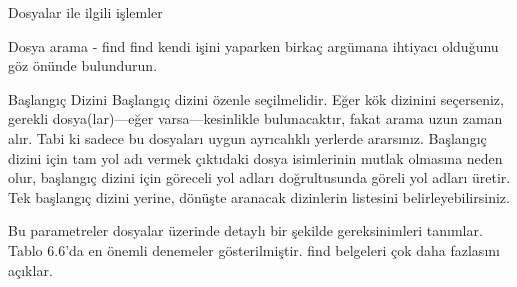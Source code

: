 \documentclass[10pt,a5paper]{book}
\begin{document}
\begin{section}{Dosyalar ile ilgili işlemler}
\begin{subsection}{Dosya arama - find}
find kendi işini yaparken birkaç argümana ihtiyacı olduğunu göz önünde bulundurun.

Başlangıç Dizini	Başlangıç dizini özenle seçilmelidir. Eğer kök dizinini seçerseniz, gerekli dosya(lar)—eğer varsa—kesinlikle bulunacaktır, fakat arama uzun zaman alır. Tabi ki sadece bu dosyaları uygun ayrıcalıklı yerlerde ararsınız.
Başlangıç dizini için tam yol adı vermek çıktıdaki dosya isimlerinin mutlak olmasına neden olur, başlangıç dizini için göreceli yol adları doğrultusunda göreli yol adları üretir. Tek başlangıç dizini yerine, dönüşte aranacak dizinlerin listesini belirleyebilirsiniz.

Bu parametreler dosyalar üzerinde detaylı bir şekilde gereksinimleri tanımlar. Tablo 6.6'da en önemli denemeler gösterilmiştir. find belgeleri çok daha fazlasını açıklar.


\end{subsection}
\end{section}
\end{document}
